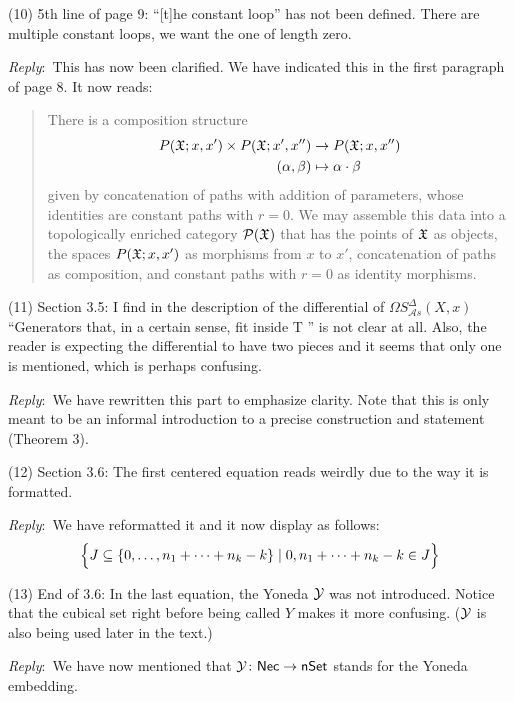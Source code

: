 \documentclass{amsart}
\newcommand{\ar}{\medskip\noindent\textit{Reply}:\ }
\newcommand{\rp}{\medskip\noindent}
\begin{document}
	\rp (10) 5th line of page 9: “[t]he constant loop” has not been defined.
	There are multiple constant loops, we want the one of length zero.

	\ar This has now been clarified. We have indicated this in the first paragraph of page 8.
    It now reads:
    \begin{quote}
        There is a composition structure
        \begin{equation}
        \begin{split}
            P(\fX;x,x') \times P(\fX;x',x'') &\to P(\fX;x,x'') \\
            (\alpha, \beta) &\mapsto \alpha \cdot \beta
        \end{split}
        \end{equation}
        given by concatenation of paths with addition of parameters, whose identities are constant paths with $r=0$.
        We may assemble this data into a topologically enriched category $\mathcal{P}(\fX)$ that has the points of $\fX$ as objects, the spaces $P(\fX;x,x')$ as morphisms from $x$ to $x'$, concatenation of paths as composition, and constant paths with $r=0$ as identity morphisms.
    \end{quote}

	\rp (11) Section 3.5: I find in the description of the differential of $\Omega S^\Delta_{\mathcal A s}(X, x)$ “Generators that, in a certain sense, fit inside T ” is not clear at all.
	Also, the reader is expecting the differential to have two pieces and it seems that only one is mentioned, which is perhaps confusing.

	\ar We have rewritten this part to emphasize clarity. Note that this is only meant to be an informal introduction to a precise construction and statement (Theorem 3).

	\rp (12) Section 3.6: The first centered equation reads weirdly due to the way it is
	formatted.

	\ar We have reformatted it and it now display as follows:
	\[
	\set[\Big]{J \subseteq \set{0,\dots,n_1+\cdots+n_k-k} \mid 0,n_1+\cdots+n_k-k \in J}
	\]

	\rp (13) End of 3.6: In the last equation, the Yoneda $\yoneda$ was not introduced.
	Notice that the cubical set right before being called $Y$ makes it more confusing.
	($\yoneda$ is also being used later in the text.)

	\ar We have now mentioned that $\yoneda \colon \Nec \to \nSet$ stands for the Yoneda embedding.
\end{document}
